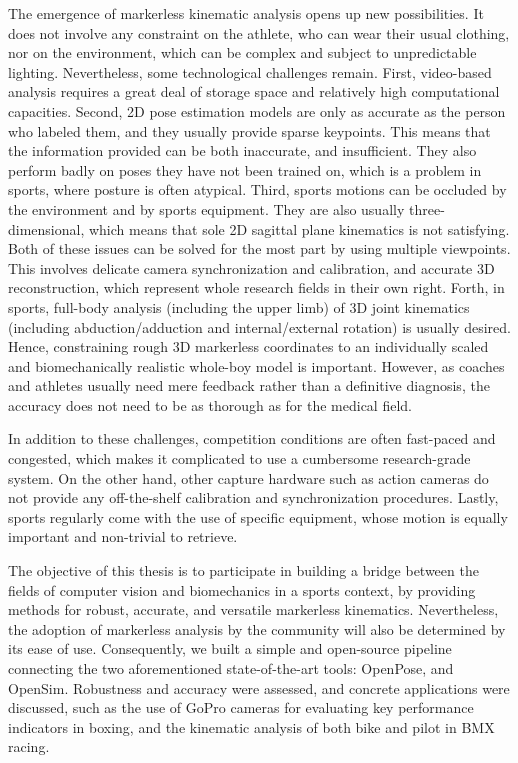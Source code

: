 The emergence of markerless kinematic analysis opens up new possibilities. It does not involve any constraint on the athlete, who can wear their usual clothing, nor on the environment, which can be complex and subject to unpredictable lighting. Nevertheless, some technological challenges remain. First, video-based analysis requires a great deal of storage space and relatively high computational capacities. Second, 2D pose estimation models are only as accurate as the person who labeled them, and they usually provide sparse keypoints. This means that the information provided can be both inaccurate, and insufficient. They also perform badly on poses they have not been trained on, which is a problem in sports, where posture is often atypical. Third, sports motions can be occluded by the environment and by sports equipment. They are also usually three-dimensional, which means that sole 2D sagittal plane kinematics is not satisfying. Both of these issues can be solved for the most part by using multiple viewpoints. This involves delicate camera synchronization and calibration, and accurate 3D reconstruction, which represent whole research fields in their own right. Forth, in sports, full-body analysis (including the upper limb) of 3D joint kinematics (including abduction/adduction and internal/external rotation) is usually desired. Hence, constraining rough 3D markerless coordinates to an individually scaled and biomechanically realistic whole-boy model is important. However, as coaches and athletes usually need mere feedback rather than a definitive diagnosis, the accuracy does not need to be as thorough as for the medical field. 

In addition to these challenges, competition conditions are often fast-paced and congested, which makes it complicated to use a cumbersome research-grade system. On the other hand, other capture hardware such as action cameras do not provide any off-the-shelf calibration and synchronization procedures. Lastly, sports regularly come with the use of specific equipment, whose motion is equally important and non-trivial to retrieve. 

The objective of this thesis is to participate in building a bridge between the fields of computer vision and biomechanics in a sports context, by providing methods for robust, accurate, and versatile markerless kinematics. Nevertheless, the adoption of markerless analysis by the community will also be determined by its ease of use. Consequently, we built a simple and open-source pipeline connecting the two aforementioned state-of-the-art tools: OpenPose, and OpenSim. Robustness and accuracy were assessed, and concrete applications were discussed, such as the use of GoPro cameras for evaluating key performance indicators in boxing, and the kinematic analysis of both bike and pilot in BMX racing.


